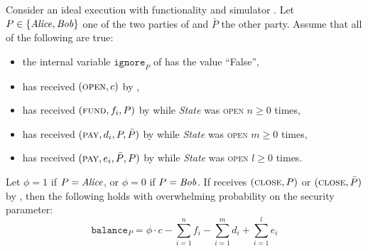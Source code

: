 \begin{lemma}
\label{lemma:ideal-balance}
  Consider an ideal execution with functionality \fchan and simulator
  \simulator.
  Let $P \in \{\mathit{Alice}, \mathit{Bob}\}$ one of the two parties of \fchan and $\bar{P}$
  the other party. Assume that all of the following are true:
  \begin{itemize}
    \item the internal variable $\texttt{ignore}_P$ of \fchan has the value
    ``False'',
    \item \fchan has received $(\textsc{open}, c)$ by \simulator,
    \item \fchan has received $(\textsc{fund}, f_i, P)$ by \simulator while
    \textit{State} was \textsc{open} $n \geq 0$ times,
    \item \fchan has received $(\textsc{pay}, d_i, P, \bar{P})$ by \simulator
    while \textit{State} was \textsc{open} $m \geq 0$ times,
    \item \fchan has received $(\textsc{pay}, e_i, \bar{P}, P)$ by \simulator
    while \textit{State} was \textsc{open} $l \geq 0$ times.
  \end{itemize}
  Let $\phi = 1$ if $P = \mathit{Alice}$, or $\phi = 0$ if $P = \mathit{Bob}$. If \fchan
  receives $(\textsc{close}, P)$ or $(\textsc{close}, \bar{P})$ by \simulator,
  then the following holds with overwhelming probability on the security
  parameter:
  \begin{equation}
    \texttt{balance}_P = \phi \cdot c - \sum\limits_{i=1}^n f_i -
    \sum\limits_{i=1}^m d_i + \sum\limits_{i=1}^l e_i
  \end{equation}
\end{lemma}

